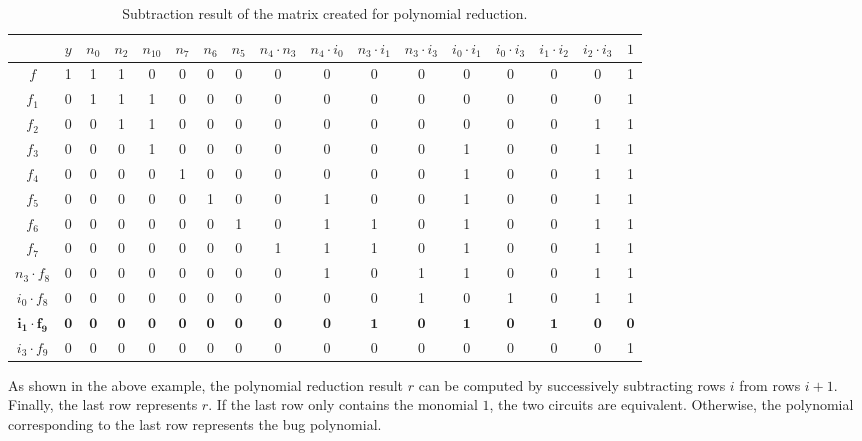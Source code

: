\begin{Example}
	
	\begin{table} 
	\begin{center}
	\caption{Subtraction result of the matrix created for polynomial reduction.} 
	\label{tab:redres}
	\begin{tabular}[hbt]{|c||c|c|c|c|c|c|c|c|c|c|c|c|c|c|c|c|} \hline 
				&$y$ 	&$n_0$ &$n_2$	&$n_{10}$	 &$n_7$	&$n_6$  &$n_5$   &$n_4\cdot n_3$  &$n_4\cdot i_0$ 	&$n_3\cdot i_1$	&$n_3\cdot i_3$	&$i_0\cdot i_1$		&$i_0\cdot i_3$ 	&$i_1\cdot i_2$	 &$i_2\cdot i_3$   &$1$ \\
		\hline
		$f$   		&1	&1	&1	&0		&0	&0	&0	&0	&0	&0	&0	&0	&0	&0	&0	&1 \\
		\hline
		$f_1$ 		&0	&1	&1	&1		&0	&0	&0	&0	&0	&0	&0	&0	&0	&0	&0	&1 \\
		\hline
		$f_2$ 		&0	&0	&1	&1		&0	&0	&0	&0	&0	&0	&0	&0	&0	&0	&1	&1 \\
		\hline
		$f_3$		&0	&0	&0	&1		&0	&0	&0	&0	&0	&0	&0	&1	&0	&0	&1	&1 \\
		\hline
		$f_4$		&0	&0	&0	&0		&1	&0	&0	&0	&0	&0	&0	&1	&0	&0	&1	&1\\
		\hline{}
		$f_5$		&0	&0	&0	&0		&0	&1	&0	&0	&1	&0	&0	&1	&0	&0	&1	&1\\
		\hline{}
		$f_6$		&0	&0	&0	&0		&0	&0	&1	&0	&1	&1	&0	&1	&0	&0	&1	&1\\
		\hline{}
		$f_7$		&0	&0	&0	&0		&0	&0	&0	&1	&1	&1	&0	&1	&0	&0	&1	&1\\
	\hline{}
$n_3\cdot f_{8}$	&0	&0	&0	&0		&0	&0	&0	&0	&1	&0	&1	&1	&0	&0	&1	&1\\
	\hline{}
$i_0\cdot f_{8}$ 	&0	&0	&0	&0		&0	&0	&0	&0	&0	&0	&1	&0	&1	&0	&1	&1\\
	\hline
$\mathbf{i_1 \cdot f_{9}}$	&$\mathbf{0}$	&$\mathbf{0}$	&$\mathbf{0}$	&$\mathbf{0}$	&$\mathbf{0}$	&$\mathbf{0}$	&$\mathbf{0}$	
&$\mathbf{0}$	&$\mathbf{0}$	&$\mathbf{1}$	&$\mathbf{0}$	&$\mathbf{1}$	&$\mathbf{0}$	&$\mathbf{1}$	&$\mathbf{0}$	&$\mathbf{0}$\\
	\hline
$i_3 \cdot f_{9}$	&0	&0	&0	&0		&0	&0	&0	&0	&0	&0	&0	&0	&0	&0	&0	&1\\
	\hline
	\end{tabular}
	\end{center}
	\end{table} 
\end{Example}


As shown in the above example, the polynomial reduction
result $r$ can be computed by successively subtracting  rows $i$ from
rows $i+1$. Finally, the last row represents $r$. If the last row only
contains the monomial $1$, the two circuits are equivalent. Otherwise, the
polynomial corresponding to the last row represents the bug polynomial. 

